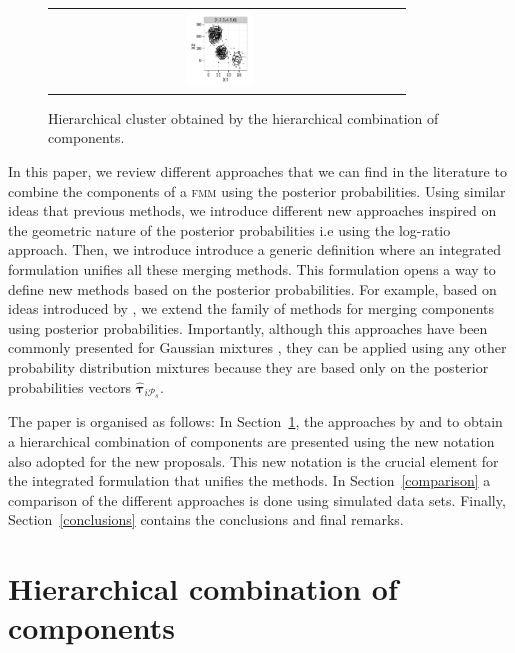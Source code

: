 \documentclass[10pt, a4paper]{article}
\newcommand{\m}[1]{\boldsymbol{#1}}
\newcommand{\fmm}{\textsc{fmm}\xspace}
\begin{document}
\begin{spacing}{1.9}
\begin{figure}[thbp]
\begin{center}
\begin{tabular}{cc}
            \includegraphics[trim=0cm 0cm 0cm 0cm,width=0.2\textwidth]{partition-example-part1.pdf}
 \end{tabular}
 \caption{Hierarchical cluster obtained by the hierarchical combination of components.}\label{hierarchical}
\end{center}
\end{figure}

In this paper, we review different approaches that we can find in the literature \citep{baudry2010combining, hennig2010methods} to combine the components of a \fmm using the posterior probabilities. Using similar ideas that previous methods, we introduce different new approaches inspired on the geometric nature of the posterior probabilities i.e using the log-ratio approach. Then, we introduce  introduce a generic definition where an integrated formulation unifies all these merging methods.  This formulation opens a way to define new methods based on the posterior probabilities. For example, based on ideas introduced by \cite{longford2014}, we extend the family of methods for merging components using posterior probabilities.  Importantly, although this approaches have been commonly presented for Gaussian mixtures \citep{longford2014,melnykov2013distribution,hennig2010methods,baudry2010combining}, they can be applied using any other probability distribution mixtures because they are based only on the posterior probabilities vectors $\hat{\m\tau}_{i \mathcal{P}_s}$.

The paper is organised as follows: In Section~\ref{old_methods}, the approaches by \cite{hennig2010methods} and \cite{baudry2010combining} to obtain a hierarchical combination of components are presented using the new notation also adopted for the new proposals. This new notation is the crucial element for the integrated formulation that unifies the methods. In Section~\ref{comparison} a comparison of the different approaches is done using simulated data sets. Finally, Section~\ref{conclusions} contains the conclusions and final remarks.


\section{Hierarchical combination of components}
\label{old_methods}



\end{spacing}
\end{document}
